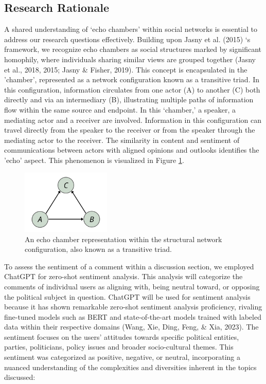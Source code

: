 \documentclass[
  man,floatsintext]{apa6}
\begin{document}
\subsection{Research Rationale}\label{research-rationale}

A shared understanding of `echo chambers' within social networks is essential to address our research questions effectively. Building upon Jasny et al. (2015) `s framework, we recognize echo chambers as social structures marked by significant homophily, where individuals sharing similar views are grouped together (Jasny et al., 2018, 2015; Jasny \& Fisher, 2019). This concept is encapsulated in the 'chamber', represented as a network configuration known as a transitive triad. In this configuration, information circulates from one actor (A) to another (C) both directly and via an intermediary (B), illustrating multiple paths of information flow within the same source and endpoint. In this `chamber,' a speaker, a mediating actor and a receiver are involved. Information in this configuration can travel directly from the speaker to the receiver or from the speaker through the mediating actor to the receiver. The similarity in content and sentiment of communications between actors with aligned opinions and outlooks identifies the 'echo' aspect. This phenomenon is visualized in Figure \ref{fig:echo-chamber-structure}.



\begin{figure}[H]

{\centering \includegraphics[width=1.67in,]{SNA4DS_Report_files/figures/transitive_triad_2} 

}

\caption{An echo chamber representation within the structural network configuration, also known as a transitive triad.}\label{fig:echo-chamber-structure}
\end{figure}

To assess the sentiment of a comment within a discussion section, we employed ChatGPT for zero-shot sentiment analysis. This analysis will categorize the comments of individual users as aligning with, being neutral toward, or opposing the political subject in question. ChatGPT will be used for sentiment analysis because it has shown remarkable zero-shot sentiment analysis proficiency, rivaling fine-tuned models such as BERT and state-of-the-art models trained with labeled data within their respective domains (Wang, Xie, Ding, Feng, \& Xia, 2023).
The sentiment focuses on the users' attitudes towards specific political entities, parties, politicians, policy issues and broader socio-cultural themes. This sentiment was categorized as positive, negative, or neutral, incorporating a nuanced understanding of the complexities and diversities inherent in the topics discussed:
\end{document}

